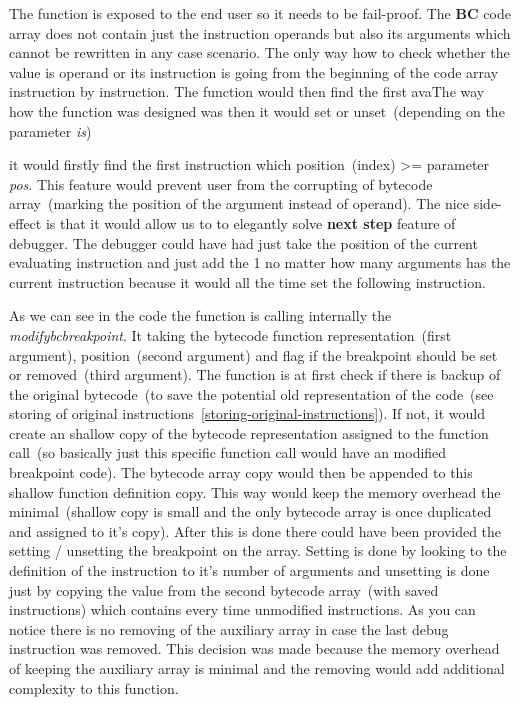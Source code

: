 \documentclass[thesis=M,english]{FITthesis}[2018/10/20]
\begin{document}
The function is exposed to the end user so it needs to be fail-proof. The \textbf{BC} code array does not contain just the instruction operands but also its arguments which cannot be rewritten in any case scenario. The only way how to check whether the value is operand or its instruction  is going from the beginning of the code array instruction by instruction. The function would then find the first avaThe way how the function was designed was then it would set or unset~(depending on the parameter \textit{is})

 it would firstly find the first instruction which position~(index) >= parameter \textit{pos}. This feature would prevent user from the corrupting of bytecode array~(marking the position of the argument instead of operand). The nice side-effect is that it would allow us to to elegantly solve \textbf{next step} feature of debugger. The debugger could have had just take the position of the current evaluating instruction and just add the 1 no matter how many arguments has the current instruction because it would all the time set the following instruction.

As we can see in the code the function is calling internally the \textit{modifybcbreakpoint}. It taking the bytecode function representation~(first argument), position~(second argument) and flag if the breakpoint should be set or removed~(third argument). The function is at first check if there is backup of the original bytecode~(to save the potential old representation of the code~(see storing of original instructions~\ref{storing-original-instructions}). If not, it would create an shallow copy of the bytecode representation assigned to the function call~(so basically just this specific function call would have an modified breakpoint code). The bytecode array copy would then be appended to this shallow function definition copy. This way would keep the memory overhead the minimal~(shallow copy is small and the only bytecode array is once duplicated and assigned to it's copy). After this is done there could have been provided the setting / unsetting the breakpoint on the array. Setting is done by looking to the definition of the instruction to it's number of arguments and unsetting is done just by copying the value from the second bytecode array~(with saved instructions) which contains every time unmodified instructions. As you can notice there is no removing of the auxiliary array in case the last debug instruction was removed. This decision was made because the memory overhead of keeping the auxiliary array is minimal and the removing would add additional complexity to this function.
\end{document}
